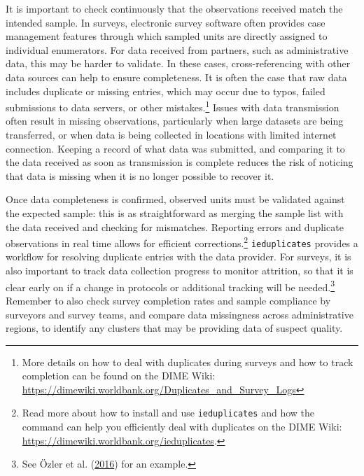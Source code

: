 \documentclass[
]{book}
\begin{document}
It is important to check continuously that the observations received match the intended sample.
In surveys, electronic survey software often provides case management features
through which sampled units are directly assigned to individual enumerators.
For data received from partners, such as administrative data,
this may be harder to validate.
In these cases, cross-referencing with other data sources can help to ensure completeness.
It is often the case that raw data includes duplicate or missing entries,
which may occur due to typos, failed submissions to data servers,
or other mistakes.\footnote{More details on how to deal with duplicates during surveys
  and how to track completion
  can be found on the DIME Wiki:
  \url{https://dimewiki.worldbank.org/Duplicates_and_Survey_Logs}}
Issues with data transmission often result in missing observations,
particularly when large datasets are being transferred,
or when data is being collected in locations with limited internet connection.
Keeping a record of what data was submitted,
and comparing it to the data received as soon as transmission is complete
reduces the risk of noticing that data is missing when it is no longer possible to recover it.

Once data completeness is confirmed,
observed units must be validated against the expected sample:
this is as straightforward as merging the sample list
with the data received and checking for mismatches.
Reporting errors and duplicate observations in real time allows for efficient corrections.\footnote{Read more about how to install and use \texttt{ieduplicates} and
  how the command can help you efficiently deal with duplicates
  on the DIME Wiki:
  \url{https://dimewiki.worldbank.org/ieduplicates}.}
\texttt{ieduplicates} provides a workflow for resolving duplicate entries with the data provider.
For surveys, it is also important to track data collection progress to monitor attrition,
so that it is clear early on if a change in protocols or additional tracking will be needed.\footnote{See Özler et al. (\protect\hyperlink{ref-ozler2016combining}{2016}) for an example.}
Remember to also check survey completion rates
and sample compliance by surveyors and survey teams,
and compare data missingness across administrative regions,
to identify any clusters that may be providing data of suspect quality.
\end{document}
